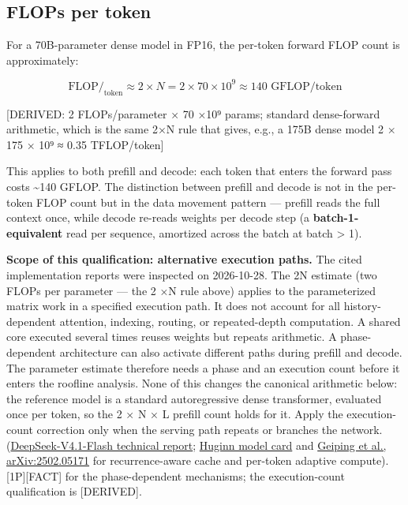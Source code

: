 \subsection{FLOPs per token}\label{flops-per-token}

For a 70B-parameter dense model in FP16, the per-token forward FLOP
count is approximately:

\[
\text{FLOP/}_{\text{token}} \approx 2 \times N = 2 \times 70 \times 10^9 \approx 140 \text{ GFLOP/token}
\]

{[}DERIVED: 2 FLOPs/parameter × 70 ×10⁹ params; standard dense-forward
arithmetic, which is the same 2×N rule that gives, e.g., a 175B dense
model 2 × 175 × 10⁹ ≈ 0.35 TFLOP/token{]}

This applies to both prefill and decode: each token that enters the
forward pass costs \textasciitilde140 GFLOP. The distinction between
prefill and decode is not in the per-token FLOP count but in the data
movement pattern --- prefill reads the full context once, while decode
re-reads weights per decode step (a \textbf{batch-1-equivalent} read per
sequence, amortized across the batch at batch \textgreater{} 1).

\textbf{Scope of this qualification: alternative execution paths.} The
cited implementation reports were inspected on 2026-10-28. The 2N
estimate (two FLOPs per parameter --- the 2 ×N rule above) applies to
the parameterized matrix work in a specified execution path. It does not
account for all history-dependent attention, indexing, routing, or
repeated-depth computation. A shared core executed several times reuses
weights but repeats arithmetic. A phase-dependent architecture can also
activate different paths during prefill and decode. The parameter
estimate therefore needs a phase and an execution count before it enters
the roofline analysis. None of this changes the canonical arithmetic
below: the reference model is a standard autoregressive dense
transformer, evaluated once per token, so the 2 × N × L prefill count
holds for it. Apply the execution-count correction only when the serving
path repeats or branches the network.
(\href{https://huggingface.co/deepseek-ai/DeepSeek-V4.1-Flash/resolve/main/DeepSeek_V41_Tech_Report.pdf}{DeepSeek-V4.1-Flash
technical report};
\href{https://huggingface.co/tomg-group-umd/huginn-0125/raw/main/README.md}{Huginn
model card} and \href{https://arxiv.org/abs/2502.05171}{Geiping et al.,
arXiv:2502.05171} for recurrence-aware cache and per-token adaptive
compute). \mbox{{[}1P{]}}\hspace{0pt}\mbox{{[}FACT{]}} for the phase-dependent mechanisms; the
execution-count qualification is \mbox{{[}DERIVED{]}}.

